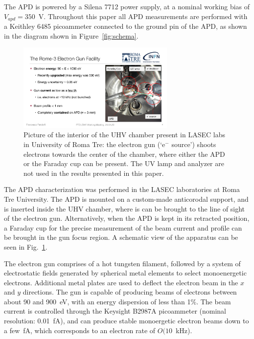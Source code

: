 \documentclass[12p]{paper}
\begin{document}
The APD is powered by a Silena 7712 power supply, at a nominal working bias of $V_{apd} = 350$~V. Throughout this paper all APD measurements are performed with a Keithley 6485 picoammeter connected to the ground pin of the APD, as shown in the diagram shown in Figure~\ref{fig:schema}. 

\begin{figure}[tb]
  \centering
\includegraphics[width=0.69\textwidth]{figures/chamber_photo}
 \caption{Picture of the interior of the UHV chamber present in LASEC labs in University of Roma Tre: the electron gun (`e$^{-}$ source') shoots electrons towards the center of the chamber, where either the APD or the Faraday cup can be present. The UV lamp and analyzer are not used in the results presented in this paper.
  \label{fig:gun}}
\end{figure}


The APD characterization was performed in the LASEC laboratories at Roma Tre University. The APD is mounted on a custom-made anticorodal support, and is inserted inside the UHV chamber, where is can be brought to the line of sight of the electron gun. Alternatively, when the APD is kept in its retracted position, a Faraday cup for the precise measurement of the beam current and profile can be brought in the gun focus region. A schematic view of the apparatus can be seen in Fig.~\ref{fig:gun}.

The electron gun comprises of a hot tungsten filament, followed by a system of electrostatic fields generated by spherical metal elements to select monoenergetic electrons. Additional metal plates are used to deflect the electron beam in the $x$ and $y$ directions. The gun is capable of producing beams of electrons between about 90 and 900~eV, with an energy dispersion of less than 1\%. The beam current is controlled through the Keysight B2987A picoammeter (nominal resolution: 0.01~fA), and can produce stable monoergetic electron beams down to a few~fA, which corresponds to an electron rate of $O(10$~kHz).
\end{document}
